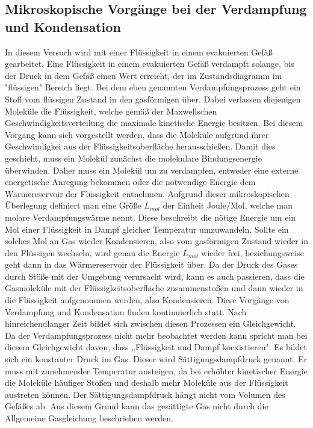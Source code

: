 \subsection{Mikroskopische Vorgänge bei der Verdampfung und Kondensation}
\label{subsec:T_VK}
In diesem Versuch wird mit einer Flüssigkeit in einem evakuierten Gefäß gearbeitet. Eine Flüssigkeit in einem evakuierten Gefäß verdampft solange, bis der Druck in dem Gefäß einen Wert erreicht,
der im Zustandsdiagramm im "flüssigen"\: Bereich liegt. Bei dem eben genannten Verdampfungsprozess
geht ein Stoff vom flüssigen Zustand in den gasförmigen über. Dabei verlassen diejenigen Moleküle die Flüssigkeit, welche gemäß der Maxwellschen Geschwindigkeitsverteilung die maximale kinetische 
Energie besitzen. Bei diesem Vorgang kann sich vorgestellt werden, dass die Moleküle aufgrund ihrer Geschwindigkei aus der Flüssigkeitsoberfläche herausschießen. Damit dies geschieht, muss
ein Molekül zunächst die molekulare Bindungsenergie überwinden. Daher muss ein Molekül um zu verdampfen, entweder eine externe energetische Anregung bekommen oder die notwendige Energie
dem Wärmereservoir der Flüssigkeit entnehmen. Aufgrund dieser mikroskopischen Überlegung definiert man eine Größe $L_{mol}$ der Einheit Joule/Mol, welche man molare Verdampfungswärme nennt. Diese beschreibt die nötige Energie
um ein Mol einer Flüssigkeit in Dampf gleicher Temperatur umzuwandeln. Sollte ein solches Mol an Gas wieder Kondensieren, also vom gasförmigen Zustand wieder in den Flüssigen wechseln, wird genau
die Energie $L_{mol}$ wieder frei, beziehungsweise geht dann in das Wärmereservoir der Flüssigkeit über. Da der Druck des Gases durch Stöße mit der Umgebung verursacht wird, kann es auch passieren, dass
die Gasmoleküle mit der Flüssigkeitsoberfläche zusammenstoßen und dann wieder in die Flüssigkeit aufgenommen werden, also Kondensieren. Diese Vorgänge von Verdampfung und 
Kondensation finden kontinuierlich statt.
Nach hinreichendlanger Zeit bildet sich zwischen diesen Prozessen ein Gleichgewicht. Da der Verdampfungsprozess nicht mehr beobachtet werden kann spricht man bei diesem Gleichgewicht
davon, dass „Flüssigkeit und Dampf koexistieren". Es bildet sich ein konstanter Druck im Gas. Dieser wird Sättigungsdampfdruck genannt. Er muss mit zunehmender Temperatur ansteigen, da bei
erhöhter kinetischer Energie die Moleküle häufiger Stoßen und deshalb mehr Moleküle aus der Flüssigkeit austreten können. Der Sättigungsdampfdruck hängt nicht vom Volumen des Gefäßes ab. 
Aus diesem Grund kann das gesättigte Gas nicht durch die Allgemeine Gasgleichung beschrieben werden.
